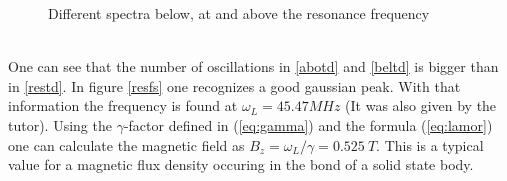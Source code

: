 \begin{figure}[H]
            \caption{Different spectra below, at and above the resonance frequency}
         \end{figure}
         \ \\
     One can see that the number of oscillations in \ref{abotd} and \ref{beltd} is bigger than in \ref{restd}. In figure \ref{resfs} one recognizes a good gaussian peak.
     With that information the frequency is found at $\omega_L = 45.47\unit{MHz}$ (It was also given by the tutor). Using the $\gamma$-factor defined in (\ref{eq:gamma}) and the formula (\ref{eq:lamor}) one can calculate the magnetic field as $B_z = \omega_L/\gamma = 0.525\ \unit{T}$. This is a typical value for a magnetic flux density occuring in the bond of a solid state body.
         
